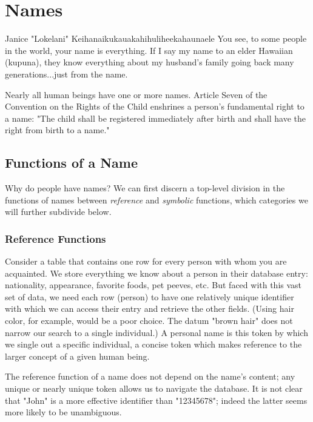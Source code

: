 \section{Names}

\begin{aquote}{Janice "Lokelani" Keihanaikukauakahihuliheekahaunaele}
You see, to some people in the world, your name is everything. If I say my name
to an elder Hawaiian (kupuna), they know everything about my husband's family
going back many generations...just from the name.
\end{aquote}

Nearly all human beings have one or more names. Article Seven of the Convention on
the Rights of the Child enshrines a person's fundamental right to a name: "The
child shall be registered immediately after birth and shall have the right from
birth to a name." \parencite{crc}

\subsection{Functions of a Name}

Why do people have names? We can first discern a top-level division in the
functions of names between \textit{reference} and \textit{symbolic} functions,
which categories we will further subdivide below.

\subsubsection{Reference Functions}

Consider a table that contains one row for every person with whom you are
acquainted. We store everything we know about a person in their database entry:
nationality, appearance, favorite foods, pet peeves, etc. But faced with this
vast set of data, we need each row (person) to have one relatively unique
identifier with which we can access their entry and retrieve the other fields.
(Using hair color, for example, would be a poor choice. The datum "brown hair"
does not narrow our search to a single individual.) A personal name is this
token by which we single out a specific individual, a concise token which makes
reference to the larger concept of a given human being.

The reference function of a name does not depend on the name's content; any
unique or nearly unique token allows us to navigate the database. It is not
clear that "John" is a more effective identifier than "12345678"; indeed the
latter seems more likely to be unambiguous.

